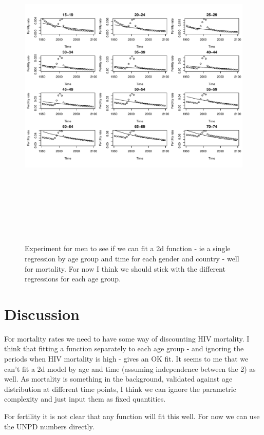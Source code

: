 \documentclass{article}
\begin{document}
\begin{figure}
\includegraphics[width=16cm,height=16cm]{EstimatingRatesFromUNPDv2-Testmortality2d} 

\caption{Experiment for men to see if we can fit a 2d function - ie a single regression by age group and time for each gender and country -  well for mortality. For now I think we should stick with the different regressions for each age group.}
\label{ExperimentSingleRegression}
\end{figure}

\section*{Discussion}

For mortality rates we need to have some way of discounting HIV mortality. I think that fitting a function separately to each age group  - and ignoring the periods when HIV mortality is high - gives an OK fit. It seems to me that we can't fit a 2d model by age and time (assuming independence between the 2) as well. As mortality is something in the background, validated against age distribution at different time points, I think we can ignore the parametric complexity and just input them as fixed quantities.

For fertility it is not clear that any function will fit this well. For now we can use the UNPD numbers directly.
\end{document}
